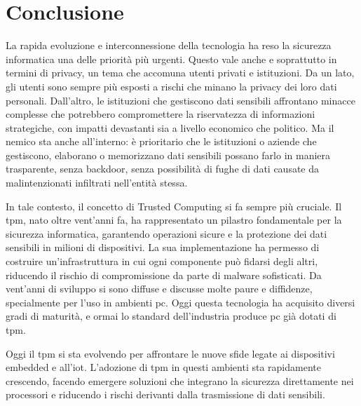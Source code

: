 \chapter*{Conclusione}\label{ch:conclusione}

La rapida evoluzione e interconnessione della tecnologia ha reso la sicurezza informatica una delle priorità più urgenti. Questo vale anche e soprattutto in termini di privacy, un tema che accomuna utenti privati e istituzioni. Da un lato, gli utenti sono sempre più esposti a rischi che minano la privacy dei loro dati personali. Dall'altro, le istituzioni che gestiscono dati sensibili affrontano minacce complesse che potrebbero compromettere la riservatezza di informazioni strategiche, con impatti devastanti sia a livello economico che politico. Ma il nemico sta anche all’interno: è prioritario che le istituzioni o aziende che gestiscono, elaborano o memorizzano dati sensibili possano farlo in maniera trasparente, senza backdoor, senza possibilità di fughe di dati causate da malintenzionati infiltrati nell’entità stessa.

In tale contesto, il concetto di Trusted Computing si fa sempre più cruciale. Il \acrshort{tpm}, nato oltre vent’anni fa, ha rappresentato un pilastro fondamentale per la sicurezza informatica, garantendo operazioni sicure e la protezione dei dati sensibili in milioni di dispositivi. La sua implementazione ha permesso di costruire un’infrastruttura in cui ogni componente può fidarsi degli altri, riducendo il rischio di compromissione da parte di malware sofisticati. Da vent’anni di sviluppo si sono diffuse e discusse molte paure e diffidenze, specialmente per l'uso in ambienti \acrshort{pc}. Oggi questa tecnologia ha acquisito diversi gradi di maturità, e ormai lo standard dell’industria produce \acrshort{pc} già dotati di \acrshort{tpm}. 

Oggi il \acrshort{tpm} si sta evolvendo per affrontare le nuove sfide legate ai dispositivi embedded e all’\acrshort{iot}. L'adozione di \acrshort{tpm} in questi ambienti sta rapidamente crescendo, facendo emergere soluzioni che integrano la sicurezza direttamente nei processori e riducendo i rischi derivanti dalla trasmissione di dati sensibili.

